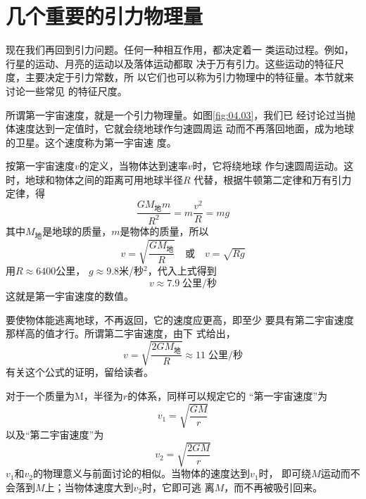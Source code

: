 \section{几个重要的引力物理量}\label{sec:04.05}

现在我们再回到引力问题。任何一种相互作用，都决定着一
类运动过程。例如，行星的运动、月亮的运动以及落体运动都取
决于万有引力。这些运动的特征尺度，主要决定于引力常数，所
以它们也可以称为引力物理中的特征量。本节就来讨论一些常见
的特征尺度。

所谓第一宇宙速度，就是一个引力物理量。如图\ref{fig:04.03}，我们已
经讨论过当抛体速度达到一定值时，它就会绕地球作匀速圆周运
动而不再落回地面，成为地球的卫星。这个速度称为第一宇宙速
度。

按第一宇宙速度$ v $的定义，当物体达到速率$ v $时，它将绕地球
作匀速圆周运动。这时，地球和物体之间的距离可用地球半径$ R $
代替，根据牛顿第二定律和万有引力定律，得
\begin{equation*}
  \frac { G M _ \text{地} m } { R ^ { 2 } } = m \frac { v ^ { 2 } } { R } = m g
\end{equation*}
其中$ M _ \text{地} $是地球的质量，$ m $是物体的质量，所以
\begin{equation}\label{eqn:04.05.01}
  v = \sqrt {  \frac { G M _ { \text{地} } } { R }}
  \quad \text{或} \quad v = \sqrt { R g }
\end{equation}
用$ R\approx 6400 $公里， $ g \approx 9.8 $米/秒$ ^2 $，代入上式得到
\begin{equation*}
  v \approx 7.9 \;\text{公里/秒}
\end{equation*}
这就是第一宇宙速度的数值。

要使物体能逃离地球，不再返回，它的速度应更高，即至少
要具有第二宇宙速度那样高的值才行。所谓第二宇宙速度，由下
式给出，
\begin{equation*}
  v = \sqrt{\frac { 2 G M _ { \text{地} } } { R }} \approx 11 \;\text{公里/秒}
\end{equation*}
有关这个公式的证明，留给读者。

对于一个质量为M，半径为$ r $的体系，同样可以规定它的
“第一宇宙速度”为
\begin{equation}\label{eqn:04.05.02}
  v _ { 1 } = \sqrt {\frac { G M } { r }}
\end{equation}
以及“第二宇宙速度”为
\begin{equation}\label{eqn:04.05.03}
  v _ { 2 } = \sqrt {\frac { 2 G M } { r }}
\end{equation}
$ v_1 $和$  v _ 2 $的物理意义与前面讨论的相似。当物体的速度达到$ v_1 $时，
即可绕$ M $运动而不会落到$ M $上；当物体速度大到$ v_2 $时，它即可逃
离$ M $，而不再被吸引回来。

